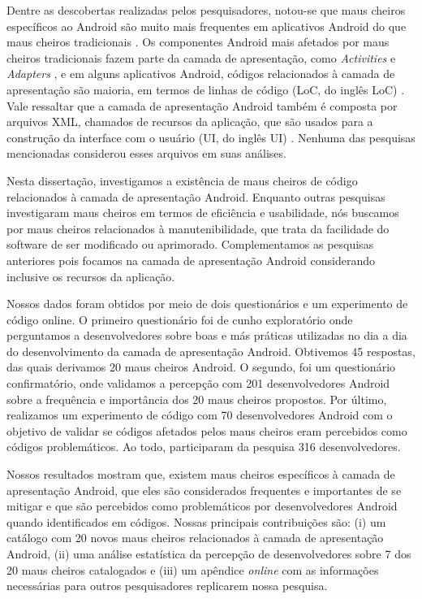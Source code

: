Dentre as descobertas realizadas pelos pesquisadores, notou-se que maus cheiros específicos ao Android são muito mais frequentes em aplicativos Android do que maus cheiros tradicionais \cite{Hecht:15}. Os componentes Android mais afetados por maus cheiros tradicionais fazem parte da camada de apresentação, como \textit{Activities} e \textit{Adapters} \cite{Hecht:15, Mantyla2013, MobileSmells:13}, e em alguns aplicativos Android, códigos relacionados à camada de apresentação são maioria, em termos de linhas de código (\acs{LoC}, do inglês \acl{LoC}) \cite{Mantyla2013}. Vale ressaltar que a camada de apresentação Android também é composta por arquivos XML, chamados de recursos da aplicação, que são usados para a construção da interface com o usuário (\acs{UI}, do inglês \acl{UI}) \cite{AndroidFundamentals}. Nenhuma das pesquisas mencionadas considerou esses arquivos em suas análises. 

Nesta dissertação, investigamos a existência de maus cheiros de código relacionados à camada de apresentação Android. Enquanto outras pesquisas investigaram maus cheiros em termos de eficiência e usabilidade, nós buscamos por maus cheiros relacionados à manutenibilidade, que trata da facilidade do software de ser modificado ou aprimorado. Complementamos as pesquisas anteriores pois focamos na camada de apresentação Android considerando inclusive os recursos da aplicação. 

Nossos dados foram obtidos por meio de dois questionários e um experimento de código online. O primeiro questionário foi de cunho exploratório onde perguntamos a desenvolvedores sobre boas e más práticas utilizadas no dia a dia do desenvolvimento da camada de apresentação Android. Obtivemos 45 respostas, das quais derivamos 20 maus cheiros Android. O segundo, foi um questionário confirmatório, onde validamos a percepção com 201 desenvolvedores Android sobre a frequência e importância dos 20 maus cheiros propostos. Por último, realizamos um experimento de código com 70 desenvolvedores Android com o objetivo de validar se códigos afetados pelos maus cheiros eram percebidos como códigos problemáticos. Ao todo, participaram da pesquisa 316 desenvolvedores.

Nossos resultados mostram que, existem maus cheiros específicos à camada de apresentação Android, que eles são considerados frequentes e importantes de se mitigar e que são percebidos como problemáticos por desenvolvedores Android quando identificados em códigos. Nossas principais contribuições são: (i) um catálogo com 20 novos maus cheiros relacionados à camada de apresentação Android, (ii) uma análise estatística da percepção de desenvolvedores sobre 7 dos 20 maus cheiros catalogados e (iii) um apêndice \textit{online} \cite{apendice} com as informações necessárias para outros pesquisadores replicarem nossa pesquisa. 

